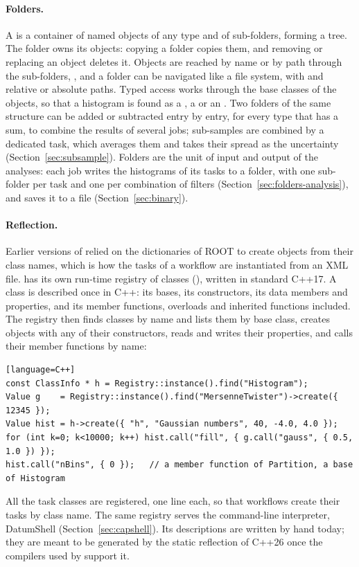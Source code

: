 \paragraph{Folders.}
A  is a container of named objects of any type and of sub-folders, forming a tree. The folder owns its
objects: copying a folder copies them, and removing or replacing an object deletes it. Objects are reached by name or
by path through the sub-folders, , and a folder can be navigated like a file
system, with  and relative or absolute paths. Typed access works through the base classes of the objects,
so that a histogram is found as a , a  or an . Two folders of the same
structure can be added or subtracted entry by entry, for every type that has a sum, to combine the results of
several jobs; sub-samples are combined by a dedicated task, which averages them and takes their spread as the
uncertainty (Section~\ref{sec:subsample}). Folders are the unit of input and output of the analyses: each job writes the
histograms of its tasks to a folder, with one sub-folder per task and one per combination of filters
(Section~\ref{sec:folders-analysis}), and saves it to a file (Section~\ref{sec:binary}).

\paragraph{Reflection.}
Earlier versions of \Datum{} relied on the dictionaries of ROOT to create objects from their class names, which is
how the tasks of a workflow are instantiated from an XML file. \Datum{} has its own run-time registry of classes
(), written in standard C++17. A class is described once in C++: its bases, its constructors,
its data members and properties, and its member functions, overloads and inherited functions included. The registry
then finds classes by name and lists them by base class, creates objects with any of their constructors, reads and
writes their properties, and calls their member functions by name:
\begin{widetext}
\begin{verbatim}[language=C++]
const ClassInfo * h = Registry::instance().find("Histogram");
Value g    = Registry::instance().find("MersenneTwister")->create({ 12345 });
Value hist = h->create({ "h", "Gaussian numbers", 40, -4.0, 4.0 });
for (int k=0; k<10000; k++) hist.call("fill", { g.call("gauss", { 0.5, 1.0 }) });
hist.call("nBins", { 0 });   // a member function of Partition, a base of Histogram
\end{verbatim}
\end{widetext}
All the task classes are registered, one line each, so that workflows create their tasks by class name. The same
registry serves the command-line interpreter, DatumShell (Section~\ref{sec:capshell}). Its descriptions are written by
hand today; they are meant to be generated by the static reflection of C++26 once the compilers used by \Datum{}
support it.

